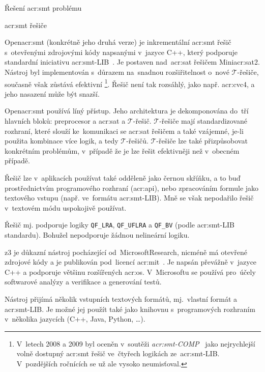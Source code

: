 \documentclass[thesis=M,czech]{FITthesis}[2012/06/26]
\newcommand{\acrlabel}[1]{acr:#1}
\newcommand{\acr}[1]{\acrshort{\acrlabel{#1}}}
\newcommand{\id}[1]{\texttt{#1}}
\newcommand{\hl}[1]{\textit{#1}}
\newcommand{\name}[1]{\hl{#1}}
\newcommand{\cit}[1]{\cite{#1}}
\newcommand{\reg}{\textsuperscript{\textregistered}}
\newcommand{\set}[1]{\ensuremath{\mathcal{#1}}}
\begin{document}
\begin{section}{Řešení \acr{smt} problému}
\begin{subsection}{\acr{smt} řešiče}

\begin{paragraph}{Open\acr{smt}}\label{p:search:smt:solver:opensmt}
(konkrétně jeho druhá verze)
je inkrementální \acr{smt} řešič
s~otevřenými zdrojovými kódy
napsanými v~jazyce C++,
který podporuje standardní iniciativu
\acr{smt}-LIB~\cit{opensmt}\cit{opensmt-art}.
Je postaven
nad~\acr{sat} řešičem Mini\acr{sat}2.
Nástroj byl implementován
s~důrazem na~snadnou rozšiřitelnost o~nové \set{T}-řešiče,
současně však zůstává efektivní%
\footnote{V~letech 2008 a 2009
byl oceněn v~soutěži
\name{\acr{smt}-COMP}~\cit{smtcomp}\cit{smtcomp-art}
jako nejrychlejší volně dostupný \acr{smt} řešič
ve~čtyřech logikách ze~\acr{smt}-LIB.
V~pozdějších ročnících se už ale vysoko neumisťoval.}.
Řešič není tak rozsáhlý,
jako např. \acr{cvc}4,
a jeho nasazení může být snazší.

Open\acr{smt} používá líný přístup.
Jeho architektura je dekomponována do~tří hlavních bloků:
preprocesor a \acr{sat} a \set{T}-řešič.
\set{T}-řešiče mají standardizované rozhraní,
které slouží ke~komunikaci se \acr{sat} řešičem a také vzájemné,
je-li použita kombinace více logik, a tedy \set{T}-řešičů.
\set{T}-řešiče lze také přizpůsobovat
konkrétním problémům,
v~případě že je lze řešit efektivněji než v~obecném případě.

Řešič lze v~aplikacích používat také odděleně
jako černou skříňku,
a to buď prostřednictvím programového rozhraní (\acr{api}),
nebo zpracováním formule jako textového vstupu
(např. ve~formátu \acr{smt}-LIB).
Mně se však nepodařilo řešič v~textovém módu uspokojivě používat.

Řešič mj. podporuje logiky
\id{QF\_\-LRA}, \id{QF\_\-UFLRA} a \id{QF\_\-BV}
(podle \acr{smt}-LIB standardu).
Bohužel nepodporuje žádnou nelineární logiku.
\end{paragraph} %


\begin{paragraph}{z3}\label{p:search:smt:solver:z3}
je důkazní nástroj pocházející od~Microsoft\reg Research,
nicméně má otevřené zdrojové kódy
a je publikován pod~licencí \acr{mit}~\cit{z3-art}\cit{z3}.
Je napsán převážně v~jazyce C++
a podporuje většinu rozšířených \acr{os}.
V~Microsoftu se používá
pro~účely softwarové analýzy a verifikace
a generování testů.

Nástroj přijímá několik vstupních textových formátů,
mj.~vlastní formát a \acr{smt}-LIB.
Je možné jej použít také jako knihovnu
s~programových rozhraním
v~několika jazycích (C++, Java, Python, \dots).


\end{paragraph}
\end{subsection}
\end{section}
\end{document}
